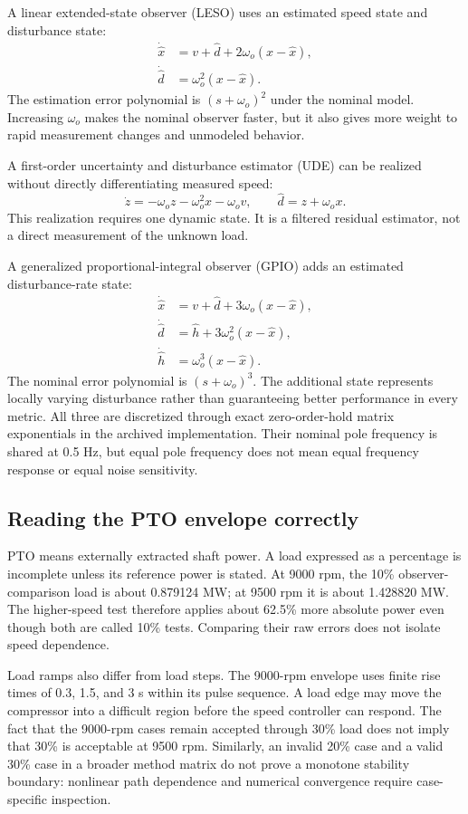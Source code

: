 A linear extended-state observer (LESO) uses an estimated speed state and disturbance state:
\begin{align}\dot{\hat x}&=v+\hat d+2\omega_o(x-\hat x),\\
\dot{\hat d}&=\omega_o^2(x-\hat x).
\end{align}
The estimation error polynomial is $(s+\omega_o)^2$ under the nominal model. Increasing $\omega_o$ makes the nominal observer faster, but it also gives more weight to rapid measurement changes and unmodeled behavior.

A first-order uncertainty and disturbance estimator (UDE) can be realized without directly differentiating measured speed:
\begin{equation}\dot z=-\omega_o z-\omega_o^2x-\omega_o v,\qquad \hat d=z+\omega_o x.
\end{equation}
This realization requires one dynamic state. It is a filtered residual estimator, not a direct measurement of the unknown load.

A generalized proportional-integral observer (GPIO) adds an estimated disturbance-rate state:
\begin{align}\dot{\hat x}&=v+\hat d+3\omega_o(x-\hat x),\\
\dot{\hat d}&=\hat h+3\omega_o^2(x-\hat x),\\
\dot{\hat h}&=\omega_o^3(x-\hat x).
\end{align}
The nominal error polynomial is $(s+\omega_o)^3$. The additional state represents locally varying disturbance rather than guaranteeing better performance in every metric. All three are discretized through exact zero-order-hold matrix exponentials in the archived implementation. Their nominal pole frequency is shared at 0.5 Hz, but equal pole frequency does not mean equal frequency response or equal noise sensitivity.

\subsection{Reading the PTO envelope correctly}
PTO means externally extracted shaft power. A load expressed as a percentage is incomplete unless its reference power is stated. At 9000 rpm, the 10\% observer-comparison load is about 0.879124 MW; at 9500 rpm it is about 1.428820 MW. The higher-speed test therefore applies about 62.5\% more absolute power even though both are called 10\% tests. Comparing their raw errors does not isolate speed dependence.

Load ramps also differ from load steps. The 9000-rpm envelope uses finite rise times of 0.3, 1.5, and 3 s within its pulse sequence. A load edge may move the compressor into a difficult region before the speed controller can respond. The fact that the 9000-rpm cases remain accepted through 30\% load does not imply that 30\% is acceptable at 9500 rpm. Similarly, an invalid 20\% case and a valid 30\% case in a broader method matrix do not prove a monotone stability boundary: nonlinear path dependence and numerical convergence require case-specific inspection.

